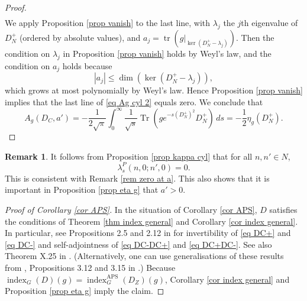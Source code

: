 \documentclass[11pt]{article}
\theoremstyle{plain}
\theoremstyle{definition}
\newtheorem{remark}[theorem]{Remark}
\theoremstyle{remark}
\numberwithin{equation}{section}
\DeclareMathOperator{\Tr}{Tr}
\DeclareMathOperator{\tr}{tr}
\DeclareMathOperator{\spec}{spec}
\DeclareMathOperator{\AS}{AS}
\DeclareMathOperator{\APS}{APS}
\DeclareMathOperator{\ind}{index}
\begin{document}
\begin{proof}
\begin{multline}
\end{multline}
We apply Proposition \ref{prop vanish} to the last line, with $\lambda_j$ the $j$th eigenvalue of $D_N^+$ (ordered by absolute values), and $a_j = \tr(g|_{\ker(D_N^+ - \lambda_j)})$. Then the condition on $\lambda_j$ in Proposition \ref{prop vanish} holds by Weyl's law, and the condition on $a_j$ holds because
\[
|a_j| \leq  \dim(\ker(D_N^+ - \lambda_j)),
\]
which grows at most polynomially by Weyl's law. Hence Proposition \ref{prop vanish}  implies that the last line of \eqref{eq Ag cyl 2} equals zero.
 We conclude that
\[
A_{g}(D_C, a')%
=-\frac{1}{2\sqrt{\pi}}\int_0^{\infty}\frac{1}{\sqrt{ s}}\Tr(g e^{-s(D_N^+)^2}D_N^+)\, ds
=-\frac{1}{2}\eta_g(D_N^+).
\]
\end{proof}

\begin{remark}\label{rem cyl zero at a}
It follows from Proposition \ref{prop kappa cyl} that for all $n,n' \in N$,
\[
\lambda_s^P(n, 0; n', 0)  = 0.
\]
This is consistent with Remark \ref{rem zero at a}. This also shows that it is important in Proposition \ref{prop eta g} that $a'>0$.
\end{remark}

\begin{proof}[Proof of Corollary \ref{cor APS}]
In the situation of Corollary \ref{cor APS},  $D$ satisfies the conditions of Theorem \ref{thm index general} and Corollary \ref{cor index general}.
In particular, see Propositions 2.5 and 2.12 in \cite{APS1} for invertibility of \eqref{eq DC+} and \eqref{eq DC-} and self-adjointness of \eqref{eq DC-DC+} and \eqref{eq DC+DC-}.
See also Theorem X.25 in \cite{RSII}.
 (Alternatively, one can  use generalisations of these results from \cite{APS1},   Propositions 3.12 and 3.15 in \cite{HW21b}.)
%
Because $\ind_G(D)(g) = \ind_G^{\APS}(D_Z)(g)$,  Corollary \ref{cor index general} and Proposition \ref{prop eta g} imply the claim.
\end{proof}
\end{document}
